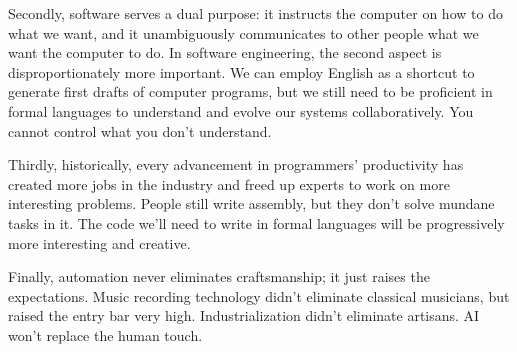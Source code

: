 \documentclass{article}
\begin{document}
Secondly, software serves a dual purpose: it instructs the computer on how to do what we want,
and it unambiguously communicates to other people what we want the computer to do.
In software engineering, the second aspect is disproportionately more important.
We can employ English as a shortcut to generate first drafts of computer programs,
but we still need to be proficient in formal languages to understand and evolve our systems collaboratively.
You cannot control what you don't understand.

Thirdly, historically, every advancement in programmers' productivity has created more jobs in the industry
and freed up experts to work on more interesting problems.
People still write assembly, but they don’t solve mundane tasks in it.
The code we'll need to write in formal languages will be progressively more interesting and creative.

Finally, automation never eliminates craftsmanship; it just raises the expectations.
Music recording technology didn't eliminate classical musicians, but raised the entry bar very high.
Industrialization didn't eliminate artisans.
AI won’t replace the human touch.
\end{document}

